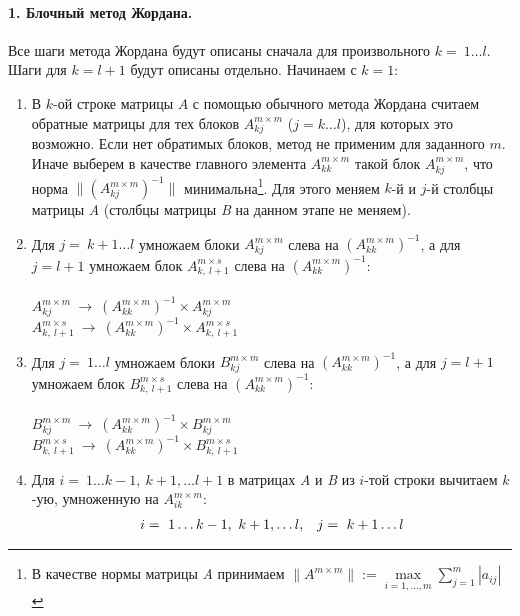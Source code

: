 \documentclass[14pt,a4paper, openany]{article}
\begin{document}
\paragraph{1. Блочный метод Жордана.}
Все шаги метода Жордана будут описаны сначала для произвольного $ k =\ 1 \ldots l $. Шаги для $ k = l+1 $ будут описаны отдельно. Начинаем с $ k = 1 $:
\begin{enumerate}
\item В $k$-ой строке матрицы $ A $ с помощью обычного метода Жордана считаем обратные матрицы для тех блоков $A_{kj}^{m \times m}$ ($ j = k \ldots l $), для которых это возможно. Если нет обратимых блоков, метод не применим для заданного $ m $. Иначе выберем в качестве главного элемента $A_{kk}^{m \times m}$ такой блок $A_{kj}^{m \times m}$, 
что норма $ \|(A_{kj}^{m \times m})^{-1}\| $ минимальна\footnote{ В качестве нормы матрицы \textit{A} принимаем $ \|A^{m \times m} \| := \max\limits_{i = 1,\ldots,m} \sum\limits_{j = 1}^m |a_{ij}| $}. Для этого меняем $k$-й и $j$-й столбцы матрицы \textit{A} (столбцы матрицы \textit{B} на данном этапе не меняем).
\item Для $j =\ k+1 \ldots l $ умножаем блоки $ A_{kj}^{m \times m}$ слева на $(A_{kk}^{m \times m})^{-1}$, а для  $j=l+1$ умножаем блок $A_{k,\ l+1}^{m \times s}$ слева на $(A_{kk}^{m \times m})^{-1}$:\\ \\$ A_{kj}^{m \times m} \ \longrightarrow \ (A_{kk}^{m \times m})^{-1} \times A_{kj}^{m \times m}$\\
$A_{k,\ l+1}^{m \times s} \ \longrightarrow \ (A_{kk}^{m \times m})^{-1} \times A_{k,\ l+1}^{m \times s}$
\item Для $j =\ 1 \ldots l $ умножаем блоки $ B_{kj}^{m \times m}$ слева на $(A_{kk}^{m \times m})^{-1}$, а для  $j=l+1$ умножаем блок $B_{k,\ l+1}^{m \times s}$ слева на $(A_{kk}^{m \times m})^{-1}$:\\ \\ $ B_{kj}^{m \times m} \ \longrightarrow \ (A_{kk}^{m \times m})^{-1} \times B_{kj}^{m \times m}$\\
$B_{k,\ l+1}^{m \times s} \ \longrightarrow \ (A_{kk}^{m \times m})^{-1} \times B_{k,\ l+1}^{m \times s}$
\item Для $i =\ 1 \ldots k-1,\ k+1, \ldots l+1 $ в матрицах \textit{A} и \textit{B} из $i$-той строки вычитаем $k$-ую, умноженную на $A _{ik}^{m \times m}$: \\
$$
\begin{array}{l l l}
i =\ 1 \ldots k-1,\ k+1, \ldots l, & j =\ k+1 \ldots l

\end{array}$$
\end{enumerate}
\end{document}
